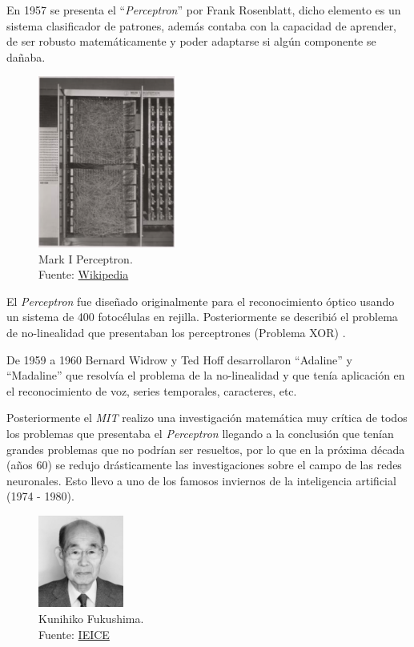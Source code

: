 En 1957 se presenta el ``\textit{Perceptron}'' por {Frank Rosenblatt}, dicho elemento es un sistema clasificador de patrones, además contaba con la capacidad de aprender, de ser robusto matemáticamente y poder adaptarse si algún componente se dañaba.

\begin{figure}[H]
  \centering
  \includegraphics[width=0.4\textwidth]{figures/perceptron.png}
  \caption{Mark I Perceptron.\\Fuente: \href{https://en.wikipedia.org/wiki/Perceptron}{Wikipedia}}
  \label{fig:perceptron}
\end{figure}

El \textit{Perceptron} fue diseñado originalmente para el reconocimiento óptico usando un sistema de 400 fotocélulas en rejilla.
Posteriormente se describió el problema de no-linealidad que presentaban los perceptrones (Problema XOR) \cite{cuevastello2018apuntes}.

De 1959 a 1960 {Bernard Widrow} y {Ted Hoff} desarrollaron ``Adaline'' y ``Madaline'' \cite{widrow1960adaptive} que resolvía el problema de la no-linealidad y que tenía aplicación en el reconocimiento de voz, series temporales, caracteres, etc.

Posteriormente el \textit{MIT} realizo una investigación matemática muy crítica de todos los problemas que presentaba el \textit{Perceptron} llegando a la conclusión que tenían grandes problemas que no podrían ser resueltos, por lo que en la próxima década (años 60) se redujo drásticamente las investigaciones sobre el campo de las redes neuronales.
Esto llevo a uno de los famosos inviernos de la inteligencia artificial (1974 - 1980).

\begin{figure}[H]
  \centering
  \includegraphics[width=0.25\textwidth]{figures/Kunihiko Fukushima.jpg}
  \caption{Kunihiko Fukushima.\\Fuente: \href{https://www.ieice.org/eng/about_ieice/new_honorary_members_award_winners/2017/meiyo_05e.html}{IEICE}}
  \label{fig:kunihiko-fukushima}
\end{figure}

